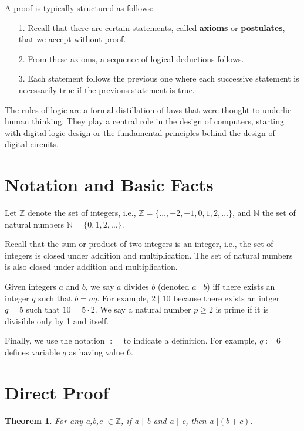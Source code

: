 \documentclass[12pt,a4paper]{article}
\newtheorem{theorem}{Theorem}[section]
\theoremstyle{definition}
\begin{document}
\bigbreak

A proof is typically structured as follows:
\begin{itemize}
	\item[1.] Recall that there are certain statements, called \textbf{axioms} or \textbf{postulates}, that we accept without proof.
	\item[2.] From these axioms, a sequence of logical deductions follows.
	\item[3.] Each statement follows the previous one where each successive statement is necessarily true if the previous statement is true.
\end{itemize}

The rules of logic are a formal distillation of laws that were thought to underlie human thinking. They play a central role in the design of computers, starting with digital logic design or the fundamental principles behind the design of digital circuits.

\section*{Notation and Basic Facts}

Let $\mathbb{Z}$ denote the set of integers, i.e., $\mathbb{Z}=\{\dots,-2,-1,0,1,2,\dots\}$, and $\mathbb{N}$ the set of natural numbers $\mathbb{N}=\{0,1,2,\dots\}$.

\bigbreak

Recall that the sum or product of two integers is an integer, i.e., the set of integers is closed under addition and multiplication. The set of natural numbers is also closed under addition and multiplication.

\bigbreak

Given integers $a$ and $b$, we say $a$ divides $b$ (denoted $a\mid b$) iff there exists an integer $q$ such that $b=aq$. For example, $2\mid 10$ because there exists an intger $q=5$ such that $10=5\cdot 2$. We say a natural number $p\geq 2$ is prime if it is divisible only by 1 and itself.

\bigbreak

Finally, we use the notation $:=$ to indicate a definition. For example, $q:=6$ defines variable $q$ as having value 6.

\section*{Direct Proof}

\begin{theorem}\label{thm2.1}
For any a,b,c $\in\mathbb{Z}$, if a $\mid$ b and a $\mid$ c, then a $\mid(b+c)$.
\end{theorem}
\end{document}
